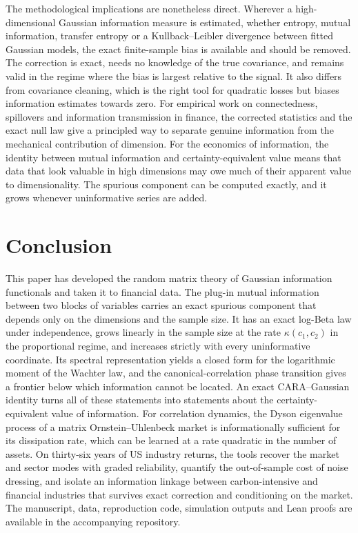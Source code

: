 The methodological implications are nonetheless direct. Wherever a high-dimensional Gaussian information measure is estimated, whether entropy, mutual information, transfer entropy or a Kullback--Leibler divergence between fitted Gaussian models, the exact finite-sample bias is available and should be removed. The correction is exact, needs no knowledge of the true covariance, and remains valid in the regime where the bias is largest relative to the signal. It also differs from covariance cleaning, which is the right tool for quadratic losses but biases information estimates towards zero. For empirical work on connectedness, spillovers and information transmission in finance, the corrected statistics and the exact null law give a principled way to separate genuine information from the mechanical contribution of dimension. For the economics of information, the identity between mutual information and certainty-equivalent value means that data that look valuable in high dimensions may owe much of their apparent value to dimensionality. The spurious component can be computed exactly, and it grows whenever uninformative series are added.

\section*{Conclusion}

This paper has developed the random matrix theory of Gaussian information functionals and taken it to financial data. The plug-in mutual information between two blocks of variables carries an exact spurious component that depends only on the dimensions and the sample size. It has an exact log-Beta law under independence, grows linearly in the sample size at the rate $\kappa(c_1,c_2)$ in the proportional regime, and increases strictly with every uninformative coordinate. Its spectral representation yields a closed form for the logarithmic moment of the Wachter law, and the canonical-correlation phase transition gives a frontier below which information cannot be located. An exact CARA--Gaussian identity turns all of these statements into statements about the certainty-equivalent value of information. For correlation dynamics, the Dyson eigenvalue process of a matrix Ornstein--Uhlenbeck market is informationally sufficient for its dissipation rate, which can be learned at a rate quadratic in the number of assets. On thirty-six years of US industry returns, the tools recover the market and sector modes with graded reliability, quantify the out-of-sample cost of noise dressing, and isolate an information linkage between carbon-intensive and financial industries that survives exact correction and conditioning on the market. The manuscript, data, reproduction code, simulation outputs and Lean proofs are available in the accompanying repository.

